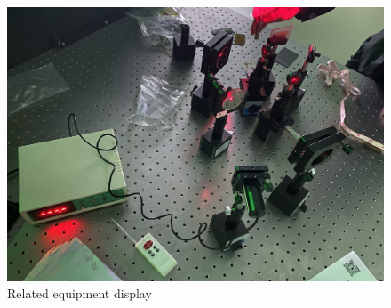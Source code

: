 \documentclass[UTF8]{article}
\begin{document}
	\begin{figure}[H]
	    	\centering
	    	\includegraphics[clip,scale=0.6,trim={0 0 0 0}]{fig/fig1.png}
	        \caption{Related equipment display}
	        \label{figure.1}
    \end{figure}    
    
\end{document}
